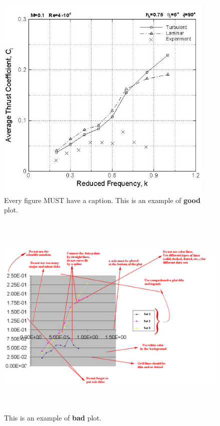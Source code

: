 \documentclass[letterpaper,12pt]{article}
\begin{document}
\begin{figure}[ht] %
        \centering \includegraphics[max height=10cm]{figures/good_plot.jpg}
        \caption{Every figure MUST have a caption. This is an example of \textbf{good} plot.}
                \label{fig:goodplot}
\end{figure}

\begin{figure}[ht] 
        \centering \includegraphics[max height=10cm]{figures/bad_plot.jpg}
        \caption{This is an example of \textbf{bad} plot.}
                \label{fig:badplot}
\end{figure}
\end{document}
